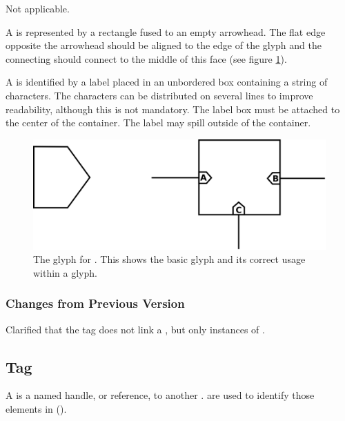 \begin{glyphDescription}

\glyphSboTerm Not applicable.

\glyphContainer A  is represented by a rectangle fused to
an empty arrowhead.  The
flat edge opposite the arrowhead should be aligned to the edge of the
 glyph and the connecting should connect to the middle
of this face (see figure \ref{fig:submapterminal}). 

\glyphLabel A  is identified by a label placed in an
unbordered box containing a string of characters.  The characters can
be distributed on several lines to improve readability, although this
is not mandatory.  The label box must be attached to the center of the
container. The label may spill outside of the container.

\end{glyphDescription}

\begin{figure}[H]
  \centering
  \includegraphics[scale = 0.3]{images/submapterminal}
  \caption{The \PD glyph for . This shows the
    basic glyph and its correct usage within a  glyph.}
  \label{fig:submapterminal}
\end{figure}

\subsubsection{Changes from Previous Version}

Clarified that the tag does not link a , but
only instances of .

\subsection{Tag}
\label{defn:Tag}

A  is a named handle, or reference, to another .   are used to identify those elements in  ().

